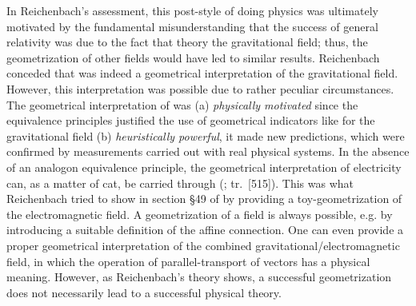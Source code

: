 \documentclass[draft]{article}
\renewcommand{\rzlp}[2]{(\cite[#1]{Reichenbach1928}; tr.\ #2)\xspace}
\renewcommand{\rzlap}[2]{(\cite[#1]{Reichenbach1928}; tr.\ [#2])\xspace}
\begin{document}


In Reichenbach's assessment, this post-\grc style of doing physics was ultimately motivated by the fundamental misunderstanding that the success of general relativity was due to the fact that theory  the gravitational field; thus, the geometrization of other fields would have led to similar results. Reichenbach conceded that \gr was indeed a geometrical interpretation of the gravitational field. However, this interpretation was possible due to rather peculiar circumstances. The geometrical interpretation of \rt was (a) \emph{physically motivated} since the equivalence principles justified the use of geometrical indicators like \rac for the gravitational field (b) \emph{heuristically powerful}, it made new predictions, which were confirmed by measurements carried out with real physical systems. In the absence of an analogon equivalence principle, the geometrical interpretation of electricity can, as a matter of cat, be carried through \rzlap{369}{515}. This was what Reichenbach tried to show in section \S49 of \Ap by providing a toy-geometrization of the electromagnetic field. A geometrization of a field is always possible, e.g. by introducing a suitable definition of the affine connection. One can even provide a proper geometrical interpretation of the combined gravitational/electromagnetic field, in which the operation of parallel-transport of vectors has a physical meaning. However, as Reichenbach's theory shows, a successful geometrization does not necessarily lead to a successful physical theory. 
\end{document}
